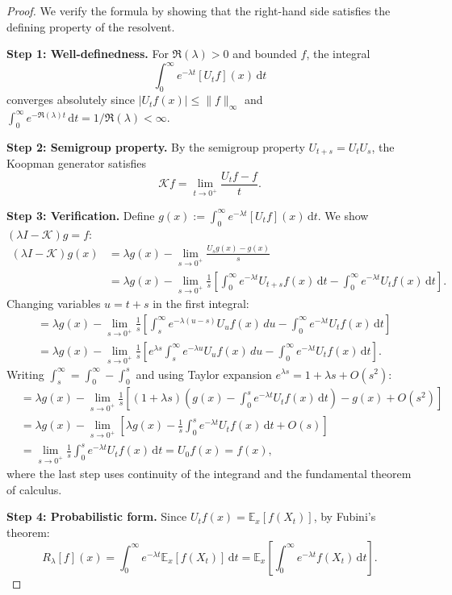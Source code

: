 \documentclass[11pt,a4paper]{article}
\newcommand{\E}{\mathbb{E}}
\newcommand{\dt}{\,\mathrm{d}t}
\newcommand{\Koop}{\mathcal{K}}
\begin{document}
\begin{proof}
We verify the formula by showing that the right-hand side satisfies the defining property of the resolvent.

\textbf{Step 1: Well-definedness.}
For $\Re(\lambda) > 0$ and bounded $f$, the integral
\begin{equation}
\int_0^\infty e^{-\lambda t} [U_t f](x) \dt
\end{equation}
converges absolutely since $|U_t f(x)| \leq \|f\|_\infty$ and $\int_0^\infty e^{-\Re(\lambda) t} \dt = 1/\Re(\lambda) < \infty$.

\textbf{Step 2: Semigroup property.}
By the semigroup property $U_{t+s} = U_t U_s$, the Koopman generator satisfies
\begin{equation}
\Koop f = \lim_{t \to 0^+} \frac{U_t f - f}{t}.
\end{equation}

\textbf{Step 3: Verification.}
Define $g(x) := \int_0^\infty e^{-\lambda t} [U_t f](x) \dt$. We show $(\lambda I - \Koop)g = f$:
\begin{align}
(\lambda I - \Koop)g(x) &= \lambda g(x) - \lim_{s \to 0^+} \frac{U_s g(x) - g(x)}{s} \\
&= \lambda g(x) - \lim_{s \to 0^+} \frac{1}{s}\left[\int_0^\infty e^{-\lambda t} U_{t+s}f(x)\dt - \int_0^\infty e^{-\lambda t} U_t f(x)\dt\right].
\end{align}
Changing variables $u = t + s$ in the first integral:
\begin{align}
&= \lambda g(x) - \lim_{s \to 0^+} \frac{1}{s}\left[\int_s^\infty e^{-\lambda(u-s)} U_u f(x)\,du - \int_0^\infty e^{-\lambda t} U_t f(x)\dt\right] \\
&= \lambda g(x) - \lim_{s \to 0^+} \frac{1}{s}\left[e^{\lambda s}\int_s^\infty e^{-\lambda u} U_u f(x)\,du - \int_0^\infty e^{-\lambda t} U_t f(x)\dt\right].
\end{align}
Writing $\int_s^\infty = \int_0^\infty - \int_0^s$ and using Taylor expansion $e^{\lambda s} = 1 + \lambda s + O(s^2)$:
\begin{align}
&= \lambda g(x) - \lim_{s \to 0^+} \frac{1}{s}\left[(1+\lambda s)\left(g(x) - \int_0^s e^{-\lambda t} U_t f(x)\dt\right) - g(x) + O(s^2)\right] \\
&= \lambda g(x) - \lim_{s \to 0^+} \left[\lambda g(x) - \frac{1}{s}\int_0^s e^{-\lambda t} U_t f(x)\dt + O(s)\right] \\
&= \lim_{s \to 0^+} \frac{1}{s}\int_0^s e^{-\lambda t} U_t f(x)\dt = U_0 f(x) = f(x),
\end{align}
where the last step uses continuity of the integrand and the fundamental theorem of calculus.

\textbf{Step 4: Probabilistic form.}
Since $U_t f(x) = \E_x[f(X_t)]$, by Fubini's theorem:
\begin{equation}
R_\lambda[f](x) = \int_0^\infty e^{-\lambda t} \E_x[f(X_t)] \dt = \E_x\left[\int_0^\infty e^{-\lambda t} f(X_t) \dt\right].
\end{equation}
\end{proof}
\end{document}

